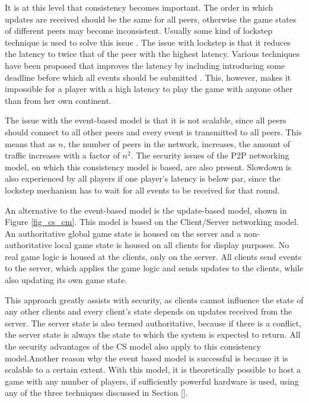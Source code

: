 \documentclass[journal,oneside,a4paper,onecolumn]{IEEEtran}
\begin{document}
It is at this level that consistency becomes important. The order in which updates are received should be the same for all peers, otherwise the game states of different peers may become inconsistent. Usually some kind of lockstep technique is used to solve this issue \cite{pessimistic_lock_step}. The issue with lockstep is that it reduces the latency to twice that of the peer with the highest latency. Various techniques have been proposed that improves the latency by including introducing some deadline before which all events should be submitted \cite{cheat_proof_event_ordering}. This, however, makes it impossible for a player with a high latency to play the game with anyone other than from her own continent.

The issue with the event-based model is that it is not scalable, since all peers should connect to all other peers and every event is transmitted to all peers. This means that as $n$, the number of peers in the network, increases, the amount of traffic increases with a factor of $n^2$. The security issues of the P2P networking model, on which this consistency model is based, are also present. Slowdown is also experienced by all players if one player's latency is below par, since the lockstep mechanism has to wait for all events to be received for that round.

An alternative to the event-based model is the update-based model, shown in Figure \ref{fig_cs_cm}. This model is based on the Client/Server networking model. An authoritative global game state is housed on the server and a non-authoritative local game state is housed on all clients for display purposes. No real game logic is housed at the clients, only on the server. All clients send events to the server, which applies the game logic and sends updates to the clients, while also updating its own game state.

This approach greatly assists with security, as clients cannot influence the state of any other clients and every client's state depends on updates received from the server. The server state is also termed authoritative, because if there is a conflict, the server state is always the state to which the system is expected to return. All the security advantages of the \ac{CS} model also apply to this consistency model.Another reason why the event based model is successful is because it is scalable to a certain extent. With this model, it is theoretically possible to host a game with any number of players, if sufficiently powerful hardware is used, using any of the three techniques discussed in Section \ref{}.
\end{document}
